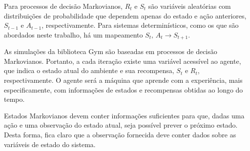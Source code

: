 
Para processos de decisão Markovianos, $R_t$ e $S_t$ são variáveis aleatórias com distribuições de probabilidade que dependem apenas do estado e ação anteriores, $S_{t-1}$ e $A_{t-1}$, respectivamente. Para sistemas determinísticos, como os que são abordados neste trabalho, há um mapeamento $S_t,\,A_t \to S_{t+1}$.

As simulações da biblioteca Gym são baseadas em processos de decisão Markovianos. Portanto, a cada iteração existe uma variável acessível ao agente, que indica o estado atual do ambiente e sua recompensa, $S_t$ e $R_t$, respectivamente. O agente será a máquina que aprende com a experiência, mais especificamente, com informações de estados e recompensas obtidas ao longo do tempo.



Estados Markovianos devem conter informações suficientes para que, dadas uma ação e uma observação do estado atual, seja possível prever o próximo estado. Desta forma, fica claro que a observação fornecida deve conter dados sobre as variáveis de estado do sistema.


